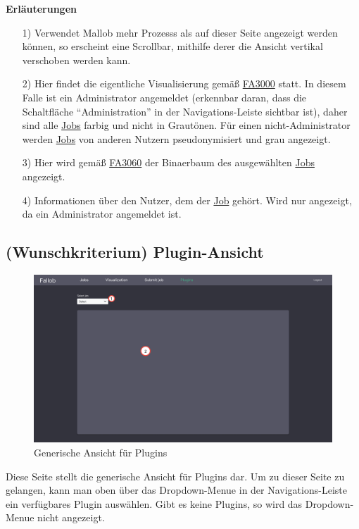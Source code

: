 \textbf{Erläuterungen}
\begin{itemize}
    \item[1)] Verwendet \gls{Mallob} mehr \glspl{Prozess} als auf dieser Seite angezeigt werden können, so erscheint eine Scrollbar, mithilfe derer die Ansicht vertikal verschoben werden kann.
    \item[2)] Hier findet die eigentliche Visualisierung gemäß \hyperref[FA:Visualisierung:Anzeigen des Systemzustandes]{FA3000} statt. In diesem Falle ist ein \gls{Administrator} angemeldet (erkennbar daran, dass die Schaltfläche \enquote{Administration} in der Navigations-Leiste sichtbar ist), daher sind alle \hyperref[B:Jobs]{Jobs} farbig und nicht in Grautönen. Für einen nicht-\gls{Administrator} werden \hyperref[B:Jobs]{Jobs} von anderen Nutzern pseudonymisiert und grau angezeigt.
    \item[3)] Hier wird gemäß \hyperref[FA:Visualisierung:Anzeigen des Binaerbaumes für einen Job]{FA3060} der \gls{Binaerbaum} des ausgewählten \hyperref[B:Jobs]{Jobs} angezeigt.
    \item[4)] Informationen über den \gls{Nutzer}, dem der \hyperref[B:Jobs]{Job} gehört. Wird nur angezeigt, da ein \gls{Administrator} angemeldet ist.
\end{itemize}


\subsection{(Wunschkriterium) Plugin-Ansicht}
\label{pages:plugin}
\begin{figure}[H]
    \centering
    \includegraphics[width=\textwidth]{images-interface/v4_interface/plugin_page_4.pdf}
    \caption{Generische Ansicht für \glspl{Plugin}}
    \label{fig:plugin-page}
\end{figure}
Diese Seite stellt die generische Ansicht für \glspl{Plugin} dar. Um zu dieser Seite zu gelangen, kann man oben über das \gls{Dropdown-Menue} in der Navigations-Leiste ein verfügbares \gls{Plugin} auswählen. Gibt es keine \glspl{Plugin}, so wird das \gls{Dropdown-Menue} nicht angezeigt. \\

